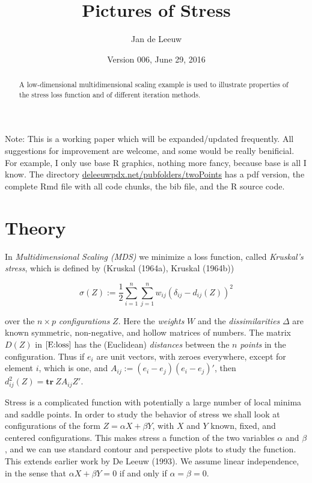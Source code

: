 \documentclass[12pt,]{article}
\title{Pictures of Stress}
\author{Jan de Leeuw}
\date{Version 006, June 29, 2016}
\begin{document}
\maketitle
\begin{abstract}
A low-dimensional multidimensional scaling example is used to illustrate
properties of the stress loss function and of different iteration
methods.
\end{abstract}

{
\setcounter{tocdepth}{3}
\tableofcontents
}
Note: This is a working paper which will be expanded/updated frequently.
All suggestions for improvement are welcome, and some would be really
benificial. For example, I only use base R graphics, nothing more fancy,
because base is all I know. The directory
\href{http://deleeuwpdx.net/pubfolders/twoPoints}{deleeuwpdx.net/pubfolders/twoPoints}
has a pdf version, the complete Rmd file with all code chunks, the bib
file, and the R source code.

\section{Theory}\label{theory}

In \emph{Multidimensional Scaling (MDS)} we minimize a loss function,
called \emph{Kruskal's stress}, which is defined by (Kruskal (1964a),
Kruskal (1964b))

\begin{equation}
\sigma(Z):=\frac12\sum_{i=1}^n\sum_{j=1}^nw_{ij}(\delta_{ij}-d_{ij}(Z))^2\label{E:loss}
\end{equation}

over the \(n\times p\) \emph{configurations} \(Z\). Here the
\emph{weights} \(W\) and the \emph{dissimilarities} \(\Delta\) are known
symmetric, non-negative, and hollow matrices of numbers. The matrix
\(D(Z)\) in \(\eqref{E:loss}\) has the (Euclidean) \emph{distances}
between the \(n\) \emph{points} in the configuration. Thus if \(e_i\)
are unit vectors, with zeroes everywhere, except for element \(i\),
which is one, and \(A_{ij}:=(e_i-e_j)(e_i-e_j)'\), then
\(d_{ij}^2(Z)=\mathbf{tr}\ ZA_{ij}Z'\).

Stress is a complicated function with potentially a large number of
local minima and saddle points. In order to study the behavior of stress
we shall look at configurations of the form \(Z=\alpha X+\beta Y\), with
\(X\) and \(Y\) known, fixed, and centered configurations. This makes
stress a function of the two variables \(\alpha\) and \(\beta\), and we
can use standard contour and perspective plots to study the function.
This extends earlier work by De Leeuw (1993). We assume linear
independence, in the sense that \(\alpha X+\beta Y=0\) if and only if
\(\alpha=\beta=0\).
\end{document}
